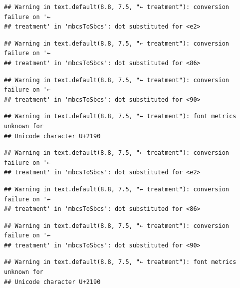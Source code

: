 \documentclass[
]{krantz}
\begin{document}
\begin{verbatim}
## Warning in text.default(8.8, 7.5, "← treatment"): conversion failure on '←
## treatment' in 'mbcsToSbcs': dot substituted for <e2>
\end{verbatim}

\begin{verbatim}
## Warning in text.default(8.8, 7.5, "← treatment"): conversion failure on '←
## treatment' in 'mbcsToSbcs': dot substituted for <86>
\end{verbatim}

\begin{verbatim}
## Warning in text.default(8.8, 7.5, "← treatment"): conversion failure on '←
## treatment' in 'mbcsToSbcs': dot substituted for <90>
\end{verbatim}

\begin{verbatim}
## Warning in text.default(8.8, 7.5, "← treatment"): font metrics unknown for
## Unicode character U+2190
\end{verbatim}

\begin{verbatim}
## Warning in text.default(8.8, 7.5, "← treatment"): conversion failure on '←
## treatment' in 'mbcsToSbcs': dot substituted for <e2>
\end{verbatim}

\begin{verbatim}
## Warning in text.default(8.8, 7.5, "← treatment"): conversion failure on '←
## treatment' in 'mbcsToSbcs': dot substituted for <86>
\end{verbatim}

\begin{verbatim}
## Warning in text.default(8.8, 7.5, "← treatment"): conversion failure on '←
## treatment' in 'mbcsToSbcs': dot substituted for <90>
\end{verbatim}

\begin{verbatim}
## Warning in text.default(8.8, 7.5, "← treatment"): font metrics unknown for
## Unicode character U+2190
\end{verbatim}
\end{document}
